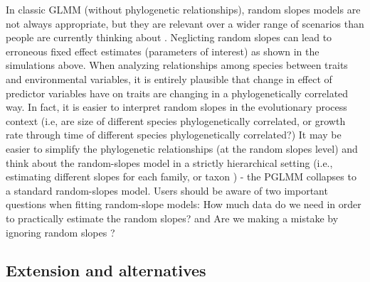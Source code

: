 \documentclass[12pt]{article}
\begin{document}
In classic GLMM (without phylogenetic relationships), random slopes models are not always appropriate, but they are relevant over a wider range of scenarios than people are currently thinking about \cite{schielzeth2008conclusions, cleasby2015quantifying,ord2010adaptation}.
Neglicting random slopes can lead to erroneous fixed effect estimates \citep{schielzeth2008conclusions} (parameters of interest) as shown in the simulations above. 
When analyzing relationships among species between traits and environmental variables, it is entirely plausible that change in effect of predictor variables have on traits are changing in a phylogenetically correlated way.
In fact, it is easier to interpret random slopes in the evolutionary process context (i.e, are size of different species phylogenetically correlated, or growth rate through time of different species phylogenetically correlated?)
It may be easier to simplify the phylogenetic relationships (at the random slopes level) and think about the random-slopes model in a strictly hierarchical setting (i.e., estimating different slopes for each family, or taxon \citep{bunnefeld2012island}) - the PGLMM collapses to a standard random-slopes model. 
Users should be aware of two important questions when fitting random-slope models: How much data do we need in order to practically estimate the random slopes? and Are we making a mistake by ignoring random slopes \citep{schielzeth2008conclusions}? 


\subsection{Extension and alternatives}
\end{document}
